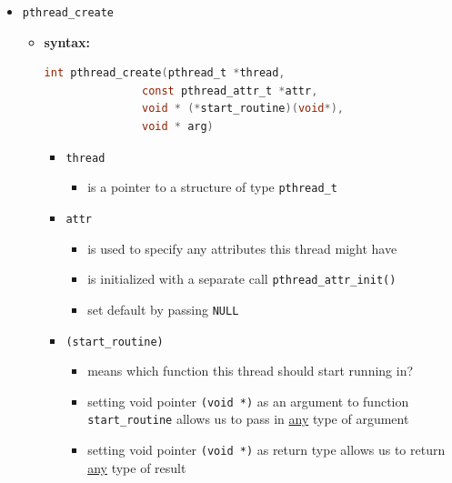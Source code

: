 \documentclass[12pt]{article}
\begin{document}
\begin{itemize}

    \item \texttt{pthread\_create}

    \begin{itemize}
        \item \textbf{syntax:}

        \bigskip
\begin{lstlisting}[language=c]
int pthread_create(pthread_t *thread,
               const pthread_attr_t *attr,
               void * (*start_routine)(void*),
               void * arg)
\end{lstlisting}

        \begin{itemize}
            \item \texttt{thread}

            \begin{itemize}
                \item is a pointer to a structure of type \texttt{pthread\_t}
            \end{itemize}
            \item \texttt{attr}

            \begin{itemize}
                \item is used to specify any attributes this thread might have
                \item is initialized with a separate call \texttt{pthread\_attr\_init()}
                \item set default by passing \texttt{NULL}
            \end{itemize}

            \item \texttt{(start\_routine)}

            \begin{itemize}
                \item means which function this thread should start running in?
                \item setting void pointer \texttt{(void *)} as an argument to function \texttt{start\_routine}
                allows us to pass in \underline{any} type of argument
                \item setting void pointer \texttt{(void *)} as return type allows us to return
                \underline{any} type of result
            \end{itemize}


\end{itemize}
\end{itemize}
\end{itemize}
\end{document}
